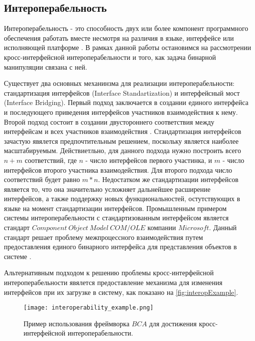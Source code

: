 \subsection{Интероперабельность}

Интероперабельность - это способность двух или более компонент программного обеспечения работать вместе несмотря на различия в языке, интерфейсе или исполняющей платформе \cite{malone2014}. В рамках данной работы остановимся на рассмотрении кросс-интерфейсной интероперабельности и того, как задача бинарной манипуляции связана с ней.

Существует два основных механинзма для реализации интероперабельности: стандартизация интерфейсов (Interface Standartization) и интерфейсный мост (Interface Bridging). Первый подход заключается в создании единого интерфейса и последующего приведения интерфейсов участников взаимодействия к нему. Второй подход состоит в создании двустороннего соответствия между интерфейсам и всех участников взаимодействия \cite{wegner1996}. Стандартизация интерфейсов зачастую явялется предпочтительным решением, поскольку является наиболее масштабируемым. Действиетльно, для данного подхода нужно построить всего $n + m$ соответствий, где $n$ - число интерфейсов первого участинка, и $m$ - число интерфейсов второго участника взаимодействия. Для второго подхода число соответствий будет равно $m * n$. Недостатком же стандартизации интерфейсов является то, что она значительно усложняет дальнейшее расширение интерфейсов, а также поддержку новых функциональностей, остутствующих в языке на момент стандартизации интерфейсов. Промышленным примером системы интероперабельности с стандартизованным интерфейсом является стандарт $Component~Object~Model~COM/OLE$ компании $Microsoft$. Данный стандарт решает проблему межпроцессного взаимодействия путем предоставления единого бинарного интерфейса для представления объектов в системе \cite{brockschmidt1995}.

Альтернативным подходом к решению проблемы кросс-интерфейсной интероперабельности явялется предоставление механизма для изменения интерфейсов при их загрузке в систему, как показано на \autoref{fig:interopExample}.

\begin{figure}[h]
\centering
\texttt{[image: interoperability\_example.png]}
\caption{Пример использования фреймворка $BCA$ для достижения кросс-интерфейсной интероперабельности.}
\label{fig:interopExample}
\end{figure}

